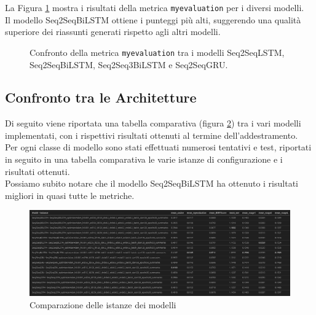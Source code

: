 La Figura \ref{fig:myevaluation_comparison} mostra i risultati della metrica \texttt{myevaluation} per i diversi modelli.\\
Il modello Seq2SeqBiLSTM ottiene i punteggi pi\`u alti, suggerendo una qualit\`a superiore dei riassunti generati rispetto agli altri modelli.
\begin{figure}[H]
    \centering
    \hfill
    \hfill
    \hfill
    \hfill

    \caption{Confronto della metrica \texttt{myevaluation} tra i modelli Seq2SeqLSTM, Seq2SeqBiLSTM, Seq2Seq3BiLSTM e Seq2SeqGRU.}
    \label{fig:myevaluation_comparison}
\end{figure}

\subsection{Confronto tra le Architetture}
Di seguito viene riportata una tabella comparativa (figura \ref{fig:models_comparison_instances}) tra i vari modelli implementati, con i rispettivi risultati ottenuti al termine dell'addestramento.\\
Per ogni classe di modello sono stati effettuati numerosi tentativi e test, riportati in seguito in una tabella comparativa le varie istanze di configurazione e i risultati ottenuti.\\
Possiamo subito notare che il modello Seq2SeqBiLSTM ha ottenuto i risultati migliori in quasi tutte le metriche.
\begin{figure}[H]
    \centering
    \includegraphics[width=1\textwidth]{media/models_comparison_instances.png}
    \caption{Comparazione delle istanze dei modelli}
    \label{fig:models_comparison_instances}
\end{figure}

